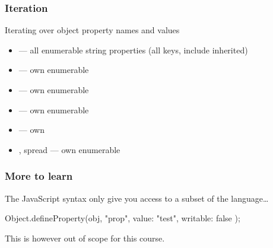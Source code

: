 \begin{frame}[fragile] \frametitle{Iteration}
Iterating over object property names and values
\begin{itemize}
  \item {} --- all enumerable string properties (all keys, include inherited)
  \item {} --- own enumerable
  \item {} --- own enumerable
  \item {} --- own enumerable
  \item {} --- own
  \item {}, spread --- own enumerable
\end{itemize}
\end{frame}

\begin{frame}[fragile] \frametitle{More to learn}

The JavaScript syntax only give you access to a subset of the language\ldots
\vspace{8mm}
\begin{CodeBox}{}
Object.defineProperty(obj, "prop", {
    value: "test",
    writable: false
});
\end{CodeBox}
\vspace{8mm}
This is however out of scope for this course.
\end{frame}

